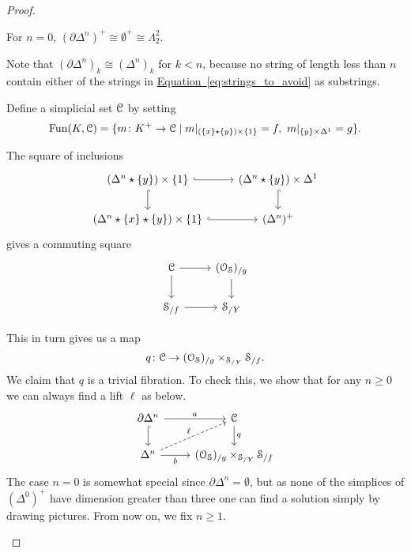 \documentclass[main.tex]{subfiles}
\begin{document}
\begin{proof}
\begin{enumerate}
\begin{itemize}
          For $n = 0$, $(\partial \Delta^{n})^{+} \cong \emptyset^{+} \cong \Lambda^{2}_{2}$.
      \end{itemize}

      Note that $(\partial \Delta^{n})_{k} \cong (\Delta^{n})_{k}$ for $k < n$, because no string of length less than $n$ contain either of the strings in \hyperref[eq:strings_to_avoid]{Equation~\ref*{eq:strings_to_avoid}} as substrings.

      Define a simplicial set $\mathcal{C}$ by setting
      \begin{equation*}
        \mathrm{Fun}(K, \mathcal{C}) = \{m\colon K^{+} \to \mathcal{C} \mid m|_{(\{x\} \star \{y\}) \times \{1\}} = f,\ m|_{\{y\} \times \Delta^{1}} = g \}.
      \end{equation*}

      The square of inclusions
      \begin{equation*}
        \begin{tikzcd}
          (\Delta^{n} \star \{y\}) \times \{1\}
          \arrow[r, hook]
          \arrow[d, hook]
          & (\Delta^{n} \star \{y\}) \times \Delta^{1}
          \arrow[d, hook]
          \\
          (\Delta^{n} \star \{x\} \star \{y\}) \times \{1\}
          \arrow[r, hook]
          & (\Delta^{n})^{+}
        \end{tikzcd}
      \end{equation*}
      gives a commuting square
      \begin{equation*}
        \begin{tikzcd}
          \category{C}
          \arrow[r]
          \arrow[d]
          & (\mathcal{O}_{\S})_{/g}
          \arrow[d]
          \\
          \S_{/f}
          \arrow[r]
          & \S_{/Y}
        \end{tikzcd}
      \end{equation*}

      This in turn gives us a map
      \begin{equation*}
        q\colon \mathcal{C} \to (\mathcal{O}_{\mathcal{S}})_{/g} \times_{\mathcal{S}_{/Y}} \mathcal{S}_{/f}.
      \end{equation*}
      We claim that $q$ is a trivial fibration. To check this, we show that for any $n \geq 0$ we can always find a lift $\ell$ as below.
      \begin{equation*}
        \begin{tikzcd}
          \partial \Delta^{n}
          \arrow[r, "a"]
          \arrow[d, hook]
          & \category{C}
          \arrow[d, "q"]
          \\
          \Delta^{n}
          \arrow[r, swap, "b"]
          \arrow[ur, dashed, "\ell"]
          & (\mathcal{O}_{\S})_{/g} \times_{\S_{/Y}} \S_{/f}
        \end{tikzcd}
      \end{equation*}
      The case $n = 0$ is somewhat special since $\partial \Delta^{n} = \emptyset$, but as none of the simplices of $(\Delta^{0})^{+}$ have dimension greater than three one can find a solution simply by drawing pictures. From now on, we fix $n \geq 1$.


\end{enumerate}
\end{proof}
\end{document}
